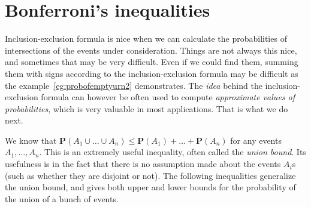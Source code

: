 \documentclass[preprint,  11pt]{amsart}
\theoremstyle{plain} %
\theoremstyle{definition} %
\begin{document}
\section{Bonferroni's inequalities}
Inclusion-exclusion formula is nice when we can calculate the probabilities of intersections of the events under consideration. Things are not always this nice, and sometimes that may be very difficult. Even if we could find them, summing them with signs according to the inclusion-exclusion formula may be difficult as the example~\ref{eg:probofemptyurn2} demonstrates. The {\em idea} behind the inclusion-exclusion formula can however be often used to compute {\em approximate values of probabilities}, which is very valuable in most applications. That is what we do next.


We know that $\mathbf{P}(A_{1}\cup \ldots \cup A_{n})\le \mathbf{P}(A_{1})+\ldots +\mathbf{P}(A_{n})$ for any events $A_{1},\ldots ,A_{n}$. This is an extremely useful inequality, often called the {\em union bound}. Its usefulness is in the fact that there is no assumption made about the events $A_{i}$s (such as whether they are disjoint or not). The following inequalities generalize the union bound, and gives both upper and lower bounds for the probability of the union of a bunch of events.
\end{document}
